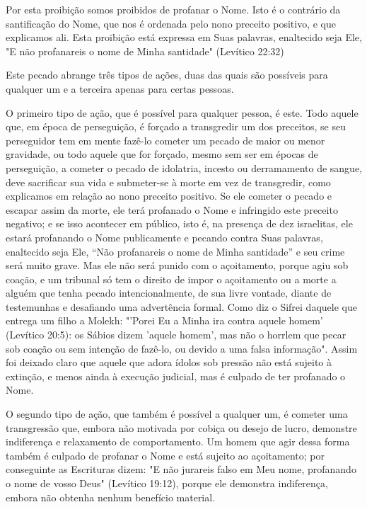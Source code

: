 Por esta proibição somos proibidos de profanar o Nome. Isto é o
contrário da santificação do Nome, que nos é ordenada pelo nono preceito
po­sitivo, e que explicamos ali. Esta proibição está expressa em Suas
palavras, enal­tecido seja Ele, "E não profanareis o nome de Minha
santidade" (Levítico 22:32)

Este pecado abrange três tipos de ações, duas das quais são possí­veis
para qualquer um e a terceira apenas para certas pessoas.

O primeiro tipo de ação, que é possível para qualquer pessoa, é es­te.
Todo aquele que, em época de perseguição, é forçado a transgredir um dos
preceitos, se seu perseguidor tem em mente fazê-lo cometer um pecado de
maior ou menor gravidade, ou todo aquele que for forçado, mesmo sem ser
em épo­cas de perseguição, a cometer o pecado de idolatria, incesto ou
derramamento de sangue, deve sacrificar sua vida e submeter-se à morte
em vez de transgre­dir, como explicamos em relação ao nono preceito
positivo. Se ele cometer o pecado e escapar assim da morte, ele terá
profanado o Nome e infringido este preceito negativo; e se isso
acontecer em público, isto é, na presença de dez israelitas, ele estará
profanando o Nome publicamente e pecando contra Suas palavras,
enaltecido seja Ele, ``Não profanareis o nome de Minha santidade'' e seu
crime será muito grave. Mas ele não será punido com o açoitamento,
por­que agiu sob coação, e um tribunal só tem o direito de impor o
açoitamento ou a morte a alguém que tenha pecado intencionalmente, de
sua livre vontade, diante de testemunhas e desafiando uma advertência
formal. Como diz o Sifrei daquele que entrega um filho a Molekh: "'Porei
Eu a Minha ira contra aquele homem' (Levítico 20:5): os Sábios dizem
'aquele homem', mas não o horrlem que pecar sob coação ou sem intenção
de fazê-lo, ou devido a uma falsa infor­mação". Assim foi deixado claro
que aquele que adora ídolos sob pressão não está sujeito à extinção, e
menos ainda à execução judicial, mas é culpado de ter profanado o Nome.

O segundo tipo de ação, que também é possível a qualquer um, é cometer
uma transgressão que, embora não motivada por cobiça ou desejo de lucro,
demonstre indiferença e relaxamento de comportamento. Um homem que agir
dessa forma também é culpado de profanar o Nome e está sujeito ao
açoitamento; por conseguinte as Escrituras dizem: "E não jurareis falso
em Meu nome, profanando o nome de vosso Deus" (Levítico 19:12), porque
ele demons­tra indiferença, embora não obtenha nenhum benefício
material.

